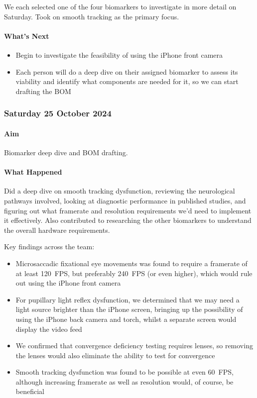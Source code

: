 We each selected one of the four biomarkers to investigate in more detail on Saturday. Took on smooth tracking as the primary focus.

\paragraph{What's Next}
\begin{itemize}
    \item Begin to investigate the feasibility of using the iPhone front camera
    \item Each person will do a deep dive on their assigned biomarker to assess its viability and identify what components are needed for it, so we can start drafting the BOM
\end{itemize}

\subsubsection*{Saturday 25 October 2024}

\paragraph{Aim}
Biomarker deep dive and BOM drafting.

\paragraph{What Happened}
Did a deep dive on smooth tracking dysfunction, reviewing the neurological pathways involved, looking at diagnostic performance in published studies, and figuring out what framerate and resolution requirements we'd need to implement it effectively. Also contributed to researching the other biomarkers to understand the overall hardware requirements.

Key findings across the team:
\begin{itemize}
    \item Microsaccadic fixational eye movements was found to require a framerate of at least 120~FPS, but preferably 240~FPS (or even higher), which would rule out using the iPhone front camera
    \item For pupillary light reflex dysfunction, we determined that we may need a light source brighter than the iPhone screen, bringing up the possibility of using the iPhone back camera and torch, whilst a separate screen would display the video feed
    \item We confirmed that convergence deficiency testing requires lenses, so removing the lenses would also eliminate the ability to test for convergence
    \item Smooth tracking dysfunction was found to be possible at even 60~FPS, although increasing framerate as well as resolution would, of course, be beneficial
\end{itemize}

